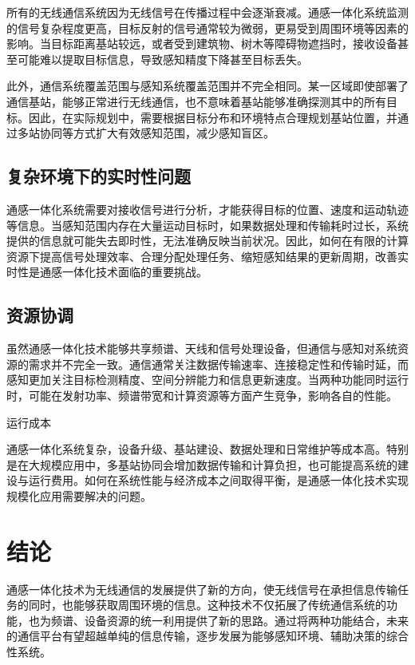 \documentclass[12pt,a4paper,UTF8,fontset=fandol]{ctexart}
\begin{document}
所有的无线通信系统因为无线信号在传播过程中会逐渐衰减。通感一体化系统监测的信号复杂程度更高，目标反射的信号通常较为微弱，更易受到周围环境等因素的影响。当目标距离基站较远，或者受到建筑物、树木等障碍物遮挡时，接收设备甚至可能难以提取目标信息，导致感知精度下降甚至目标丢失。

此外，通信系统覆盖范围与感知系统覆盖范围并不完全相同。某一区域即使部署了通信基站，能够正常进行无线通信，也不意味着基站能够准确探测其中的所有目标。因此，在实际规划中，需要根据目标分布和环境特点合理规划基站位置，并通过多站协同等方式扩大有效感知范围，减少感知盲区。

\subsection{复杂环境下的实时性问题}

通感一体化系统需要对接收信号进行分析，才能获得目标的位置、速度和运动轨迹等信息。当感知范围内存在大量运动目标时，如果数据处理和传输耗时过长，系统提供的信息就可能失去即时性，无法准确反映当前状况。因此，如何在有限的计算资源下提高信号处理效率、合理分配处理任务、缩短感知结果的更新周期，改善实时性是通感一体化技术面临的重要挑战。

\subsection{资源协调}

虽然通感一体化技术能够共享频谱、天线和信号处理设备，但通信与感知对系统资源的需求并不完全一致。通信通常关注数据传输速率、连接稳定性和传输时延，而感知更加关注目标检测精度、空间分辨能力和信息更新速度。当两种功能同时运行时，可能在发射功率、频谱带宽和计算资源等方面产生竞争，影响各自的性能。


运行成本

通感一体化系统复杂，设备升级、基站建设、数据处理和日常维护等成本高。特别是在大规模应用中，多基站协同会增加数据传输和计算负担，也可能提高系统的建设与运行费用。如何在系统性能与经济成本之间取得平衡，是通感一体化技术实现规模化应用需要解决的问题。

\section{结论}

通感一体化技术为无线通信的发展提供了新的方向，使无线信号在承担信息传输任务的同时，也能够获取周围环境的信息。这种技术不仅拓展了传统通信系统的功能，也为频谱、设备资源的统一利用提供了新的思路。通过将两种功能结合，未来的通信平台有望超越单纯的信息传输，逐步发展为能够感知环境、辅助决策的综合性系统。
\end{document}
